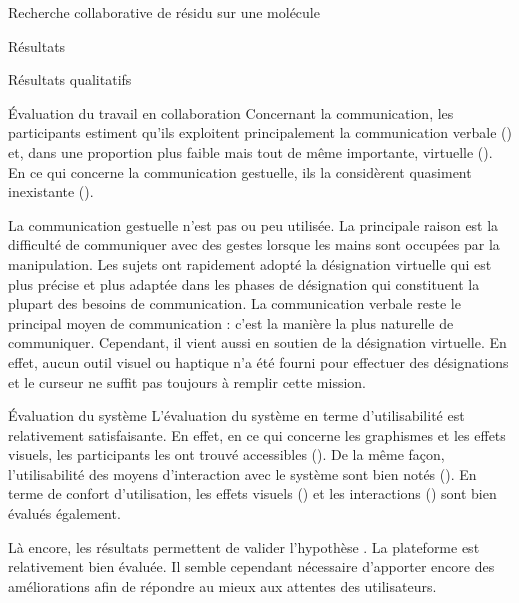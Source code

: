 \documentclass[myfrancais,ngerman,english,frenchb]{mythesis}
\begin{document}
\begin{mychapter}{Recherche collaborative de résidu sur une molécule}
\begin{mysection}{Résultats}
\begin{mysubsection}{Résultats qualitatifs}
\begin{mysubsubsection}{Évaluation du travail en collaboration}
					Concernant la communication, les participants estiment qu'ils exploitent principalement la communication verbale () et, dans une proportion plus faible mais tout de même importante, virtuelle ().
					En ce qui concerne la communication gestuelle, ils la considèrent quasiment inexistante ().

					La communication gestuelle n'est pas ou peu utilisée.
					La principale raison est la difficulté de communiquer avec des gestes lorsque les mains sont occupées par la manipulation.
					Les sujets ont rapidement adopté la désignation virtuelle qui est plus précise et plus adaptée dans les phases de désignation qui constituent la plupart des besoins de communication.
					La communication verbale reste le principal moyen de communication : c'est la manière la plus naturelle de communiquer.
					Cependant, il vient aussi en soutien de la désignation virtuelle.
					En effet, aucun outil visuel ou haptique n'a été fourni pour effectuer des désignations et le curseur ne suffit pas toujours à remplir cette mission.
				\end{mysubsubsection}
				\begin{mysubsubsection}{Évaluation du système}
					L'évaluation du système en terme d'utilisabilité est relativement satisfaisante.
					En effet, en ce qui concerne les graphismes et les effets visuels, les participants les ont trouvé accessibles ().
					De la même façon, l'utilisabilité des moyens d'interaction avec le système sont bien notés ().
					En terme de confort d'utilisation, les effets visuels () et les interactions () sont bien évalués également.

					Là encore, les résultats permettent de valider l'hypothèse .
					La plateforme est relativement bien évaluée.
					Il semble cependant nécessaire d'apporter encore des améliorations afin de répondre au mieux aux attentes des utilisateurs.


\end{mysubsubsection}
\end{mysubsection}
\end{mysection}
\end{mychapter}
\end{document}
